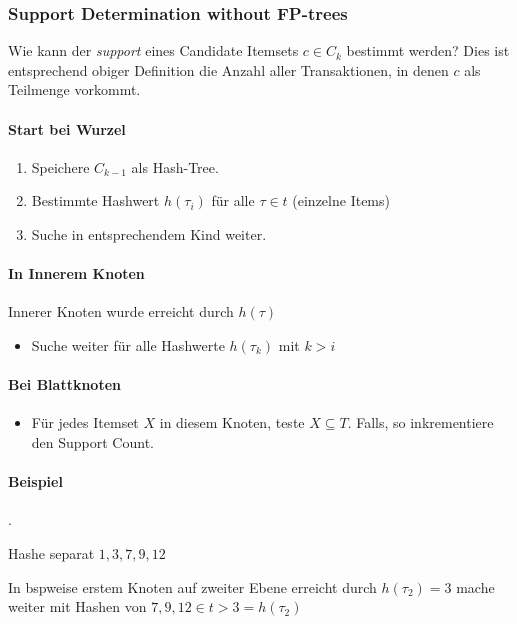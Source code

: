\documentclass[10pt]{article} %
\begin{document}
\subsubsection{Support Determination without FP-trees}
Wie kann der \textit{support} eines Candidate Itemsets $c \in C_k$
bestimmt werden? Dies ist entsprechend obiger Definition die Anzahl
aller Transaktionen, in denen $c$ als Teilmenge vorkommt.


\paragraph{Start bei Wurzel} 
\begin{enumerate}
      \item Speichere $C_{k-1}$ als Hash-Tree.
      \item Bestimmte Hashwert $h(\tau_i)$ für alle $\tau \in t$ (einzelne Items)
      \item Suche in entsprechendem Kind weiter.
\end{enumerate}

\paragraph{In Innerem Knoten} 
Innerer Knoten wurde erreicht durch $h(\tau)$
\begin{itemize}
   \item Suche weiter für alle Hashwerte $h(\tau_k)$ mit $k > i$
\end{itemize}

\paragraph{Bei Blattknoten}
\begin{itemize} 
     \item Für jedes Itemset $X$ in diesem Knoten, teste $X \subseteq
     T$. Falls, so inkrementiere den Support Count.
 \end{itemize}

\paragraph{Beispiel}
.
\begin{cptenumerate} 
      \item Hashe separat $1, 3, 7, 9, 12$
      \item In bspweise erstem Knoten auf
      zweiter Ebene erreicht durch $h(\tau_2) = 3$ mache weiter mit
      Hashen von $7, 9, 12 \in t > 3 = h(\tau_2)$
 \end{cptenumerate} 
\end{document}
